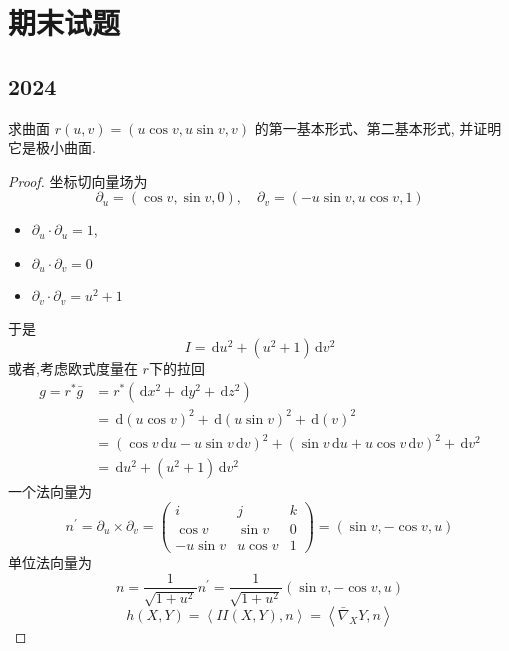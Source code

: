 \documentclass[../../main.tex]{subfiles}
\begin{document}
\chapter{期末试题}

\section{2024}
\begin{problem}

求曲面 $r(u, v) = (u \cos v, u \sin v, v)$ 的第一基本形式、第二基本形式, 并证明它是极小曲面.
\end{problem}
\begin{proof}
    坐标切向量场为\[
     \partial _{u}=  \left( \cos v,\sin v,0 \right),\quad  \partial _{v}= \left( -u\sin v,u\cos v,1 \right)  
    \] 
    \begin{itemize}
        \item \(  \partial_u\cdot \partial_u  = 1\), 
        \item \(  \partial_u\cdot \partial_v= 0  \)
        \item \(  \partial_v\cdot \partial_v= u^{2}+ 1  \)   
    \end{itemize}
    于是 \[
    I= \,\mathrm{d} u^{2}+ \left( u^{2}+ 1 \right)\,\mathrm{d} v^{2} 
    \]
    或者,考虑欧式度量在 \(  r  \)下的拉回 \[
   \begin{aligned}
   g =  r^{*}\bar{g} &= r^{*}\left( \,\mathrm{d} x^{2}+ \,\mathrm{d} y^{2}+ \,\mathrm{d} z^{2} \right) \\ 
     &= \,\mathrm{d} \left( u\cos v \right)^{2}+ \,\mathrm{d} \left( u\sin v \right)^{2}+ \,\mathrm{d} \left( v \right)^{2}\\ 
      &= \left( \cos v\,\mathrm{d} u-u\sin v\,\mathrm{d} v \right)^{2}+ \left( \sin v\,\mathrm{d} u+ u\cos v\,\mathrm{d} v \right)^{2}+ \,\mathrm{d} v^{2}\\ 
       &= \,\mathrm{d} u^{2}+ \left( u^{2}+ 1 \right)\,\mathrm{d} v^{2}      
   \end{aligned} 
    \] 一个法向量为 \[
    n^{\prime}  = \partial_u\times  \partial_v= \begin{pmatrix} 
        i&j&k\\ 
         \cos v&\sin v&0\\ 
          -u\sin v&u\cos v&1 
    \end{pmatrix}=\left( \sin v,-\cos v,u \right)  
    \] 单位法向量为 \[
    n = \frac{1 }{\sqrt{1+ u^{2}} }n^{\prime} = \frac{1 }{\sqrt{1+ u^{2}} }\left( \sin v,-\cos v,u \right)   
    \]\[
    h\left( X,Y \right)= \left< {II} \left( X,Y \right),n\right> \operatorname=  \left< \bar{\nabla}_{X}Y,n \right>
\]
\end{proof}
\end{document}
